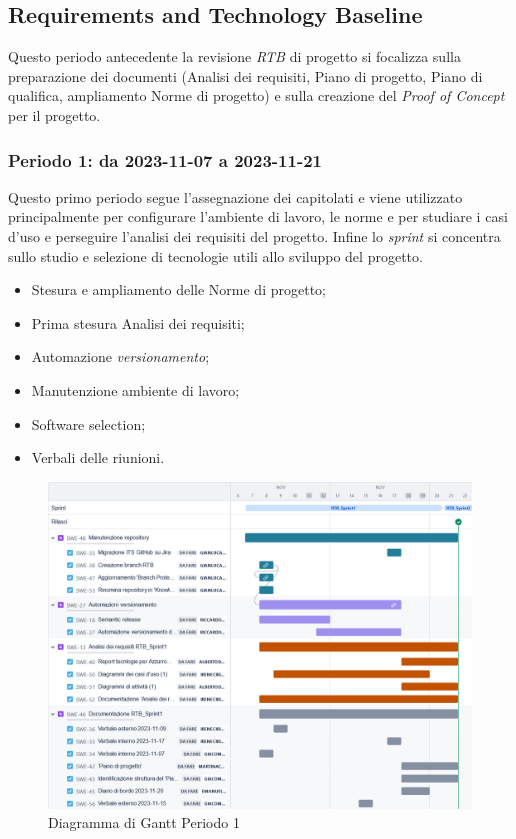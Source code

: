 \documentclass[10pt, a4paper]{article}
\begin{document}
\subsection{Requirements and Technology Baseline}
Questo periodo antecedente la revisione \textit{RTB\pg} di progetto si focalizza sulla preparazione dei documenti (Analisi dei requisiti, Piano di progetto, Piano di qualifica, ampliamento Norme di progetto) e sulla creazione del \textit{Proof of Concept\pg} per il progetto.
\subsubsection{Periodo 1: da 2023-11-07 a 2023-11-21}
Questo primo periodo segue l'assegnazione dei capitolati e viene utilizzato principalmente per configurare l'ambiente di lavoro, le norme e per studiare i casi d'uso e perseguire l'analisi dei requisiti del progetto. Infine lo \textit{sprint} si concentra sullo studio e selezione di tecnologie utili allo sviluppo del progetto.
\begin{itemize}
    \item Stesura e ampliamento delle Norme di progetto;
    \item Prima stesura Analisi dei requisiti;
    \item Automazione \textit{versionamento\pg};
    \item Manutenzione ambiente di lavoro;
    \item Software selection;
    \item Verbali delle riunioni.
        
\end{itemize}
\vspace{1em}

 \begin{figure}[H]
        \centering        
        \includegraphics[width=15.5cm]{gantt/ganttPeriodo1.png}
        \caption{Diagramma di Gantt Periodo 1 }
    \end{figure}
\newpage
\end{document}
